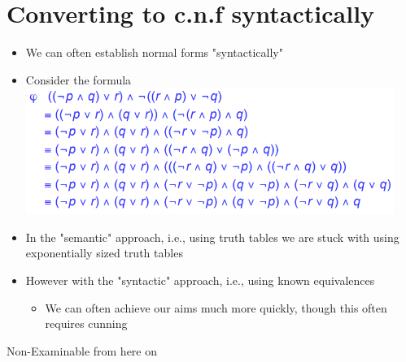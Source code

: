 \documentclass{article}[18pt]
\begin{document}
\section{Converting to c.n.f syntactically}
\begin{itemize}
\item We can often establish normal forms "syntactically"
\item Consider the formula\\
\includegraphics[width=12cm]{Fig3.png}

\item In the "semantic" approach, i.e., using truth tables we are stuck with using exponentially sized truth tables

\item However with the "syntactic" approach, i.e., using known equivalences
\begin{itemize}
\item We can often achieve our aims much more quickly, though this often requires cunning
\end{itemize}
\end{itemize}
\begin{center}
{\huge Non-Examinable from here on}
\end{center}
\end{document}
